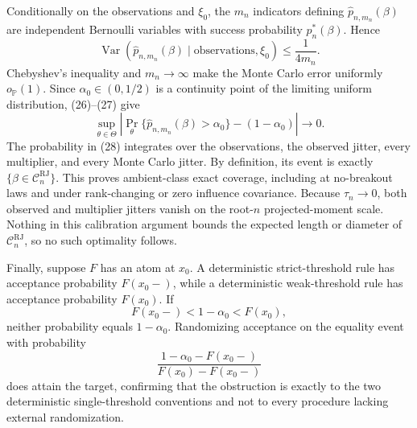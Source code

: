 Conditionally on the observations and \(\xi_0\), the \(m_n\) indicators defining \(\widehat p_{n,m_n}(\beta)\) are independent Bernoulli variables with success probability \(p_n^*(\beta)\).  Hence
\[
 \operatorname{Var}\!\left(
 \widehat p_{n,m_n}(\beta)\mid\text{observations},\xi_0
 \right)
 \leq\frac1{4m_n}. \tag{27}
\]
Chebyshev's inequality and \(m_n\to\infty\) make the Monte Carlo error uniformly \(o_{\mathbb P}(1)\).  Since \(\alpha_0\in(0,1/2)\) is a continuity point of the limiting uniform distribution, (26)--(27) give
\[
 \sup_{\theta\in\Theta}
 \left|
 \Pr_\theta\{\widehat p_{n,m_n}(\beta)>\alpha_0\}
 -(1-\alpha_0)
 \right|\longrightarrow0. \tag{28}
\]
The probability in (28) integrates over the observations, the observed jitter, every multiplier, and every Monte Carlo jitter.  By definition, its event is exactly \(\{\beta\in\mathcal C_n^{\mathrm{RJ}}\}\).  This proves ambient-class exact coverage, including at no-breakout laws and under rank-changing or zero influence covariance.  Because \(\tau_n\to0\), both observed and multiplier jitters vanish on the root-\(n\) projected-moment scale.  Nothing in this calibration argument bounds the expected length or diameter of \(\mathcal C_n^{\mathrm{RJ}}\), so no such optimality follows.

Finally, suppose \(F\) has an atom at \(x_0\).  A deterministic strict-threshold rule has acceptance probability \(F(x_0-)\), while a deterministic weak-threshold rule has acceptance probability \(F(x_0)\).  If
\[
 F(x_0-)<1-\alpha_0<F(x_0),
\]
neither probability equals \(1-\alpha_0\).  Randomizing acceptance on the equality event with probability
\[
 \frac{1-\alpha_0-F(x_0-)}{F(x_0)-F(x_0-)}
\]
does attain the target, confirming that the obstruction is exactly to the two deterministic single-threshold conventions and not to every procedure lacking external randomization.
